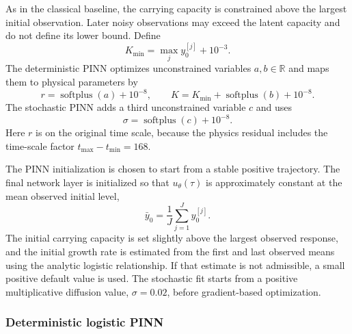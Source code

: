 As in the classical baseline, the carrying capacity is constrained above the
largest initial observation. Later noisy observations may exceed the latent
capacity and do not define its lower bound. Define
$$
  K_{\min}=\max_j y_0^{[j]}+10^{-3}.
$$
The deterministic PINN optimizes unconstrained variables $a,b\in\mathbb R$ and
maps them to physical parameters by
$$
  r=\operatorname{softplus}(a)+10^{-8},
  \qquad
  K=K_{\min}+\operatorname{softplus}(b)+10^{-8}.
$$
The stochastic PINN adds a third unconstrained variable $c$ and uses
$$
  \sigma=\operatorname{softplus}(c)+10^{-8}.
$$
Here $r$ is on the original time scale, because the physics residual includes
the time-scale factor $t_{\max}-t_{\min}=168$.

The PINN initialization is chosen to start from a stable positive trajectory.
The final network layer is initialized so that $u_\theta(\tau)$ is approximately
constant at the mean observed initial level,
$$
  \bar y_0=\frac{1}{J}\sum_{j=1}^J y_0^{[j]}.
$$
The initial carrying capacity is set slightly above the largest observed
response, and the initial growth rate is estimated from the first and last
observed means using the analytic logistic relationship. If that estimate is
not admissible, a small positive default value is used. The stochastic fit
starts from a positive multiplicative diffusion value, $\sigma=0.02$, before
gradient-based optimization.

\subsubsection{Deterministic logistic PINN}

